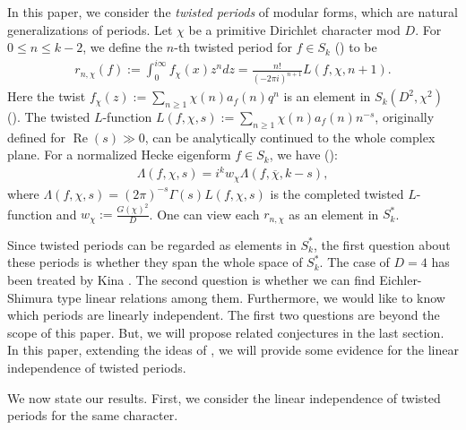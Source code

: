\documentclass[11pt,letterpaper,reqno]{amsart}
\numberwithin{figure}{section}
\numberwithin{table}{section}
\theoremstyle{definition}
\theoremstyle{plain}
\theoremstyle{definition}
\theoremstyle{definition}
\theoremstyle{remark}
\numberwithin{equation}{section}
\theoremstyle{remark}
\DeclareMathOperator{\re}{Re}
\begin{document}
In this paper, we consider the \textit{twisted periods} of modular forms, which are natural generalizations of periods. Let $\chi$ be a primitive Dirichlet character mod $D$. For $0\leq n\leq k-2$, we define the $n$-th twisted period for $f\in S_k$ (\cite[p.~978]{twistedLvaluesFukuhara}) to be 
    \begin{align}
        r_{n,\chi}(f):=\int_0^{i\infty} f_{\chi}(x) z^n dz=\frac{n!}{(-2\pi i)^{n+1}}L(f,\chi,n+1).\label{eq:periodandLvalue}
    \end{align}
Here the twist $f_{\chi}(z):=\sum_{n\geq1}\chi(n)a_f(n)q^n$ is an element in $S_{k}(D^2,\chi^2)$ (\cite[Proposition 14.19]{Iwaniecbook}).
The twisted $L$-function $L(f,\chi,s):=\sum_{n\geq1}\chi(n)a_f(n)n^{-s}$, originally defined for $\re(s)\gg0$, can be analytically continued to the whole complex plane. For a normalized Hecke eigenform $f\in S_k$, we have 
(\cite[Proposition 14.20]{Iwaniecbook}): 
    \begin{align}
 \Lambda(f,\chi,s)=i^k w_{\chi} \Lambda(f,\overline{\chi},k-s),   \label{eq:functionaleqoftwistedL}
 \end{align}
where $\Lambda(f,\chi,s)=(2\pi)^{-s}\Gamma(s)L(f,\chi,s)$ is the completed twisted $L$-function and $ w_{\chi}:=\frac{G(\chi)^2}{D}$. 
One can view each $r_{n,\chi}$  as an element in $S_k^{\ast}$.


Since twisted periods can be regarded as elements in $S_{k}^{\ast}$, the first question about these periods is whether they span the whole space of $S_k^{\ast}$. The case of $D=4$ has been treated by Kina \cite[Corollary 5.8]{KinadoubleEisenstein2024}. The second question is whether we can find Eichler-Shimura type linear relations  among them. 
Furthermore, we would like to know which periods are linearly independent. The first two questions are beyond the scope of this paper. But, we will propose related conjectures in the last section. In this paper, extending the ideas of \cite{oddperiods, evenperiods}, we will provide some evidence for the linear independence of twisted periods. 

We now state our results. First, we consider the linear independence of twisted periods for the same character.
\end{document}
